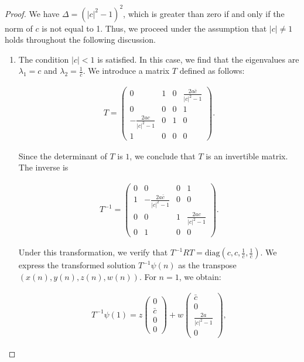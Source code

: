 \documentclass{amsart}
\theoremstyle{definition}
\theoremstyle{remark}
\begin{document}
\begin{proof}
We have \(\Delta = (|c|^2 - 1)^2\), which is greater than zero if and only if the norm of \(c\) is not equal to 1. Thus, we proceed under the assumption that \(|c| \neq 1\) holds throughout the following discussion.

\begin{enumerate}
    \item The condition \(|c| < 1\) is satisfied. In this case, we find that the eigenvalues are \(\lambda_1 = c\) and \(\lambda_2 = \frac{1}{\bar{c}}\). We introduce a matrix \(T\) defined as follows:

    \begin{align*}
    T = \begin{pmatrix}
    0 & 1 & 0 & \frac{2a \bar{c}}{|c|^2 - 1} \\
    0 & 0 & 0 & 1 \\
    -\frac{2a c}{|c|^2 - 1} & 0 & 1 & 0 \\
    1 & 0 & 0 & 0
    \end{pmatrix}.
    \end{align*}

    Since the determinant of \(T\) is $1$, we conclude that \(T\) is an invertible matrix. The inverse is

    \begin{align*}
    T^{-1} = \begin{pmatrix}
    0 & 0 & 0 & 1 \\
    1 & -\frac{2a \bar{c}}{|c|^2 - 1} & 0 & 0 \\
    0 & 0 & 1 & \frac{2a c}{|c|^2 - 1} \\
    0 & 1 & 0 & 0
    \end{pmatrix}.
    \end{align*}

    Under this transformation, we verify that \(T^{-1} R T = \text{diag}(c, c, \frac{1}{\bar{c}}, \frac{1}{\bar{c}})\). We express the transformed solution \(T^{-1} \psi(n)\) as the transpose \((x(n), y(n), z(n), w(n))\). For \(n = 1\), we obtain:

    \begin{align*}
    T^{-1} \psi(1) = z \begin{pmatrix} 0 \\ \bar{c} \\ 0 \\ 0 \end{pmatrix} + w \begin{pmatrix} \bar{c} \\ 0 \\ \frac{2a}{|c|^2 - 1} \\ 0 \end{pmatrix},
    \end{align*}


\end{enumerate}
\end{proof}
\end{document}
